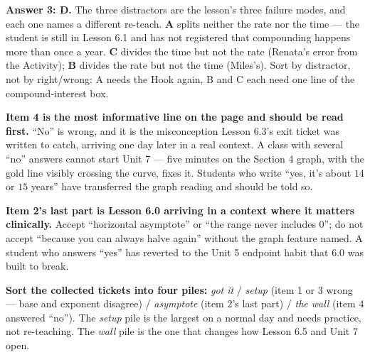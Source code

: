 \documentclass[10pt]{article}
\begin{document}
\begin{teachernote}
\textbf{Answer 3: D.} The three distractors are the lesson's three failure modes, and each one names a
different re-teach. \textbf{A} splits neither the rate nor the time --- the student is still in Lesson
6.1 and has not registered that compounding happens more than once a year. \textbf{C} divides the time
but not the rate (Renata's error from the Activity); \textbf{B} divides the rate but not the time
(Miles's). Sort by distractor, not by right/wrong: A needs the Hook again, B and C each need one line
of the compound-interest box.

\textbf{Item 4 is the most informative line on the page and should be read first.} ``No'' is wrong, and
it is the misconception Lesson 6.3's exit ticket was written to catch, arriving one day later in a real
context. A class with several ``no'' answers cannot start Unit 7 --- five minutes on the Section 4
graph, with the gold line visibly crossing the curve, fixes it. Students who write ``yes, it's about
$14$ or $15$ years'' have transferred the graph reading and should be told so.

\textbf{Item 2's last part is Lesson 6.0 arriving in a context where it matters clinically.} Accept
``horizontal asymptote'' or ``the range never includes $0$''; do not accept ``because you can always
halve again'' without the graph feature named. A student who answers ``yes'' has reverted to the Unit 5
endpoint habit that 6.0 was built to break.

\textbf{Sort the collected tickets into four piles:} \emph{got it} / \emph{setup} (item 1 or 3 wrong ---
base and exponent disagree) / \emph{asymptote} (item 2's last part) / \emph{the wall} (item 4 answered
``no''). The \emph{setup} pile is the largest on a normal day and needs practice, not re-teaching. The
\emph{wall} pile is the one that changes how Lesson 6.5 and Unit 7 open.
\end{teachernote}
\end{document}

